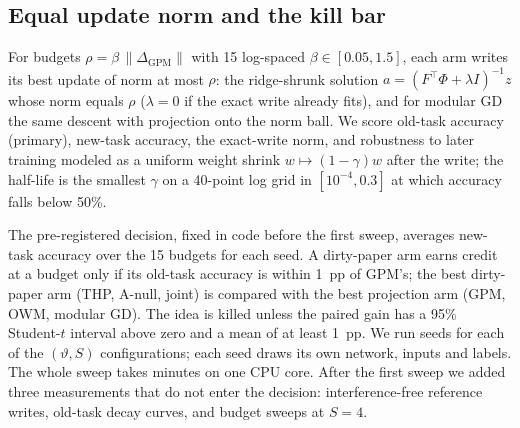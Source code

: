 \subsection{Equal update norm and the kill bar}

For budgets \(\rho=\beta\,\|\Delta_{\mathrm{GPM}}\|\) with 15 log-spaced \(\beta\in[0.05,1.5]\), each arm writes its best update of norm at most \(\rho\): the ridge-shrunk solution \(a=(F^\top\Phi+\lambda I)^{-1}z\) whose norm equals \(\rho\) (\(\lambda=0\) if the exact write already fits), and for modular GD the same descent with projection onto the norm ball.
We score old-task accuracy (primary), new-task accuracy, the exact-write norm, and robustness to later training modeled as a uniform weight shrink \(w\mapsto(1-\gamma)w\) after the write; the half-life is the smallest \(\gamma\) on a 40-point log grid in \([10^{-4},0.3]\) at which accuracy falls below 50\%.

The pre-registered decision, fixed in code before the first sweep, averages new-task accuracy over the 15 budgets for each seed.
A dirty-paper arm earns credit at a budget only if its old-task accuracy is within 1~pp of GPM's; the best dirty-paper arm (THP, A-null, joint) is compared with the best projection arm (GPM, OWM, modular GD).
The idea is killed unless the paired gain has a 95\% Student-\(t\) interval above zero and a mean of at least 1~pp.
We run \nseeds{} seeds for each of the \nconfigs{} \((\vartheta,S)\) configurations; each seed draws its own network, inputs and labels.
The whole sweep takes \runtime{} minutes on one CPU core.
After the first sweep we added three measurements that do not enter the decision: interference-free reference writes, old-task decay curves, and budget sweeps at \(S=4\).
